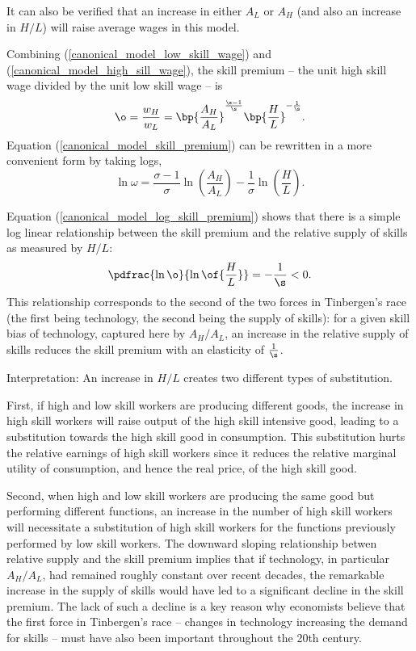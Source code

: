 \documentclass[12pt]{article}
\theoremstyle{definition}
\begin{document}
It can also be verified that an increase in either $A_L$ or $A_H$ (and also an increase in $H/L$) will raise average wages in this model.

Combining (\ref{canonical_model_low_skill_wage}) and (\ref{canonical_model_high_sill_wage}), the skill premium -- the unit high skill wage divided by the unit low skill wage -- is 
\begin{equation}
    \label{canonical_model_skill_premium}
    \o = \frac{w_H}{w_L} = \bp{\frac{A_H}{A_L}}^{\frac{\s-1}{\s}} \bp{\frac{H}{L}}^{-\frac{1}{\s}}.
\end{equation}
Equation (\ref{canonical_model_skill_premium}) can be rewritten in a more convenient form by taking logs, 
\begin{equation}
    \label{canonical_model_log_skill_premium}
    \ln \omega=\frac{\sigma-1}{\sigma} \ln \left(\frac{A_H}{A_L}\right)-\frac{1}{\sigma} \ln \left(\frac{H}{L}\right) .
\end{equation}

Equation (\ref{canonical_model_log_skill_premium}) shows that there is a simple log linear relationship between the skill premium and the relative supply of skills as measured by $H/L$:
\begin{equation}
    \label{canonical_model_skill_premium_over_supply}
    \pdfrac{\ln \o}{\ln \of{\frac{H}{L}}} = - \frac{1}{\s} < 0.
\end{equation}
This relationship corresponds to the second of the two forces in Tinbergen's race (the first being technology, the second being the supply of skills): for a given skill bias of technology, captured here by $A_H / A_L$, an increase in the relative supply of skills reduces the skill premium with an elasticity of $\frac{1}{\s}$.

Interpretation: An increase in $H/L$ creates two different types of substitution. 

First, if high and low skill workers are producing different goods, the increase in high skill workers will raise output of the high skill intensive good, leading to a substitution towards the high skill good in consumption. This substitution hurts the relative earnings of high skill workers since it reduces the relative marginal utility of consumption, and hence the real price, of the high skill good. 

Second, when high and low skill workers are producing the same good but performing different functions, an increase in the number of high skill workers will necessitate a substitution of high skill workers for the functions previously performed by low skill workers. The downward sloping relationship betwen relative supply and the skill premium implies that if technology, in particular $A_H / A_L$, had remained roughly constant over recent decades, the remarkable increase in the supply of skills would have led to a significant decline in the skill premium. The lack of such a decline is a key reason why economists believe that the first force in Tinbergen's race -- changes in technology increasing the demand for skills -- must have also been important throughout the 20th century. 
\end{document}
